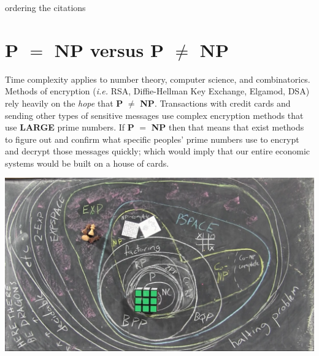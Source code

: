 \documentclass[14pt]{article}
\begin{document}
ordering the citations \cite{hackD} \cite{Fortnow} \cite{Sipser} 

\section*{\textbf{P} $ = $ \textbf{NP} versus \textbf{P} $\neq$ \textbf{NP}}
\hspace*{.25cm} Time complexity applies to number theory, computer science, and combinatorics. Methods of encryption (\emph{i.e.} RSA, Diffie-Hellman Key Exchange, Elgamod, DSA) rely heavily on the \textit{hope} that \textbf{P} $\neq$ \textbf{NP}. Transactions with credit cards and sending other types of sensitive messages use complex encryption methods that use \textbf{LARGE} prime numbers. If \textbf{P} $ = $ \textbf{NP} then that means that exist methods to figure out and confirm what specific peoples' prime numbers use to encrypt and decrypt those messages quickly; which would imply that our entire economic systems would be built on a house of cards.\\
\newpage

\includegraphics[scale=.45, angle = 90]{examples} \cite{hackD}\\





\end{document}
